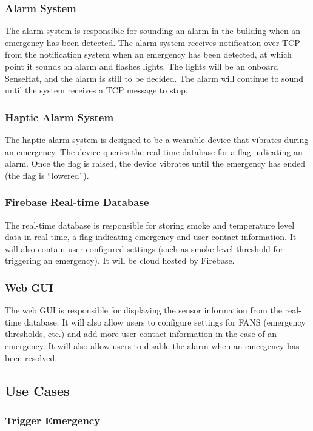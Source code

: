 \subsubsection{Alarm System}
The alarm system is responsible for sounding an alarm in the building when an emergency has been detected. The alarm
system receives notification over TCP from the notification system when an emergency has been detected, at which point
it sounds an alarm and flashes lights. The lights will be an onboard SenseHat, and the alarm is still to be decided.
The alarm will continue to sound until the system receives a TCP message to stop.

\subsubsection{Haptic Alarm System}
The haptic alarm system is designed to be a wearable device that vibrates during an emergency. The device queries the
real-time database for a flag indicating an alarm. Once the flag is raised, the device vibrates until the emergency has
ended (the flag is “lowered”).

\subsubsection{Firebase Real-time Database}
The real-time database is responsible for storing smoke and temperature level data in real-time, a flag indicating
emergency and user contact information. It will also contain user-configured settings (such as smoke level threshold
for triggering an emergency). It will be cloud hosted by Firebase.

\subsubsection{Web GUI}
The web GUI is responsible for displaying the sensor information from the real-time database. It will also allow users
to configure settings for FANS (emergency thresholds, etc.) and add more user contact information in the case of an
emergency. It will also allow users to disable the alarm when an emergency has been resolved.

\subsection{Use Cases}

\subsubsection{Trigger Emergency}

